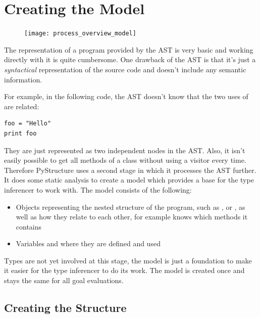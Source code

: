 \documentclass[12pt,halfparskip,DIV11,BCOR10mm]{scrreprt}
\begin{document}
\section{Creating the Model}
\label{creating_the_model}

\begin{figure}
    \vspace{-0.7cm}
    \texttt{[image: process\_overview\_model]}
    \vspace{-1cm}
\end{figure}

The representation of a program provided by the AST is very basic and working directly with it is quite cumbersome. 
One drawback of the AST is that it's just a \emph{syntactical} representation of the source code and doesn't include any semantic information.

For example, in the following code, the AST doesn't know that the two uses of  are related:

\begin{lstlisting}
foo = "Hello"
print foo
\end{lstlisting}

They are just represented as two independent  nodes in the AST. Also, it isn't easily possible to get all methods of a class without using a visitor every time. Therefore PyStructure uses a second stage in which it processes the AST further. It does some static analysis to create a model which provides a base for the type inferencer to work with. The model consists of the following:

\begin{itemize}
    \item Objects representing the nested structure of the program, such as ,  or , as well as how they relate to each other, for example  knows which methods it contains
    \item Variables and where they are defined and used
\end{itemize}

Types are not yet involved at this stage, the model is just a foundation to make it easier for the type inferencer to do its work. The model is created once and stays the same for all goal evaluations.

\subsection{Creating the Structure}
\end{document}
